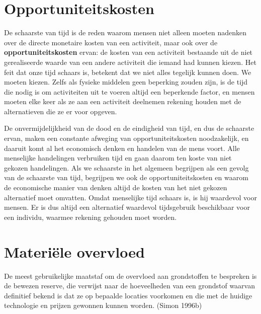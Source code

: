 \documentclass[
  a5paper,
  smalldemyvopaper,11pt,twoside,onecolumn,openright,extrafontsizes,
hidelinks]{memoir}
\begin{document}
\section{Opportuniteitskosten}\label{opportuniteitskosten}

De schaarste van tijd is de reden waarom mensen niet alleen moeten
nadenken over de directe monetaire kosten van een activiteit, maar ook
over de \textbf{opportuniteitskosten} ervan: de kosten van een
activiteit bestaande uit de niet gerealiseerde waarde van een andere
activiteit die iemand had kunnen kiezen. Het feit dat onze tijd schaars
is, betekent dat we niet alles tegelijk kunnen doen. We moeten kiezen.
Zelfs als fysieke middelen geen beperking zouden zijn, is de tijd die
nodig is om activiteiten uit te voeren altijd een beperkende factor, en
mensen moeten elke keer als ze aan een activiteit deelnemen rekening
houden met de alternatieven die ze er voor opgeven.

De onvermijdelijkheid van de dood en de eindigheid van tijd, en dus de
schaarste ervan, maken een constante afweging van opportuniteitskosten
noodzakelijk, en daaruit komt al het economisch denken en handelen van
de mens voort. Alle menselijke handelingen verbruiken tijd en gaan
daarom ten koste van niet gekozen handelingen. Als we schaarste in het
algemeen begrijpen als een gevolg van de schaarste van tijd, begrijpen
we ook de opportuniteitskosten en waarom de economische manier van
denken altijd de kosten van het niet gekozen alternatief moet omvatten.
Omdat menselijke tijd schaars is, is hij waardevol voor mensen. Er is
dus altijd een alternatief waardevol tijdsgebruik beschikbaar voor een
individu, waarmee rekening gehouden moet worden.

\section{Materiële overvloed}\label{materiuxeble-overvloed}

De meest gebruikelijke maatstaf om de overvloed aan grondstoffen te
bespreken is de bewezen reserve, die verwijst naar de hoeveelheden van
een grondstof waarvan definitief bekend is dat ze op bepaalde locaties
voorkomen en die met de huidige technologie en prijzen gewonnen kunnen
worden. (Simon 1996b)
\end{document}
